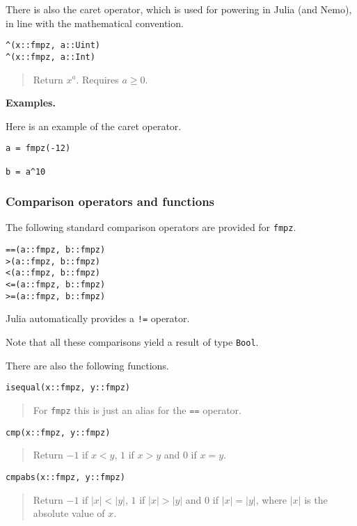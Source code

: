 \documentclass[a4paper,10pt]{article}
\newcommand{\code}{\lstinline}
\newcommand{\desc}[1]{\vspace{-3mm}\begin{quote}#1\end{quote}}
\begin{document}
{{There is also the caret operator, which is used for powering in Julia (and Nemo), in
line with the mathematical convention.

\begin{lstlisting}
^(x::fmpz, a::Uint)
^(x::fmpz, a::Int)
\end{lstlisting}

\desc{Return $x^a$. Requires $a \geq 0$.}

\textbf{Examples.}

Here is an example of the caret operator.

\begin{lstlisting}
a = fmpz(-12)

b = a^10
\end{lstlisting}

\subsubsection{Comparison operators and functions}

The following standard comparison operators are provided for \code{fmpz}.

\begin{lstlisting}
==(a::fmpz, b::fmpz)
>(a::fmpz, b::fmpz)
<(a::fmpz, b::fmpz)
<=(a::fmpz, b::fmpz)
>=(a::fmpz, b::fmpz)
\end{lstlisting}

Julia automatically provides a \code{!=} operator.

Note that all these comparisons yield a result of type \code{Bool}.

There are also the following functions.

\begin{lstlisting}
isequal(x::fmpz, y::fmpz)
\end{lstlisting}

\desc{For \code{fmpz} this is just an alias for the \code{==} operator.}

\begin{lstlisting}
cmp(x::fmpz, y::fmpz)
\end{lstlisting}

\desc{Return $-1$ if $x < y$, $1$ if $x > y$ and $0$ if $x = y$.}

\begin{lstlisting}
cmpabs(x::fmpz, y::fmpz)
\end{lstlisting}

\desc{Return $-1$ if $|x| < |y|$, $1$ if $|x| > |y|$ and $0$ if 
$|x| = |y|$, where $|x|$ is the absolute value of $x$.}

}}
\end{document}
